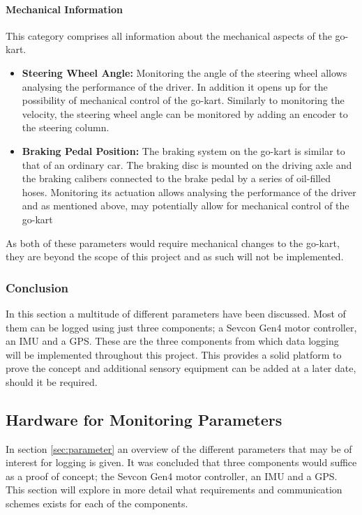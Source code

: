 \paragraph*{Mechanical Information}
This category comprises all information about the mechanical aspects of the go-kart.
\begin{itemize}
	\item \textbf{Steering Wheel Angle:} Monitoring the angle of the steering wheel allows analysing the performance of the driver.
	In addition it opens up for the possibility of mechanical control of the go-kart.
	Similarly to monitoring the velocity, the steering wheel angle can be monitored by adding an encoder to the steering column.
	\item \textbf{Braking Pedal Position:} The braking system on the go-kart is similar to that of an ordinary car.
	The braking disc is mounted on the driving axle and the braking calibers connected to the brake pedal by a series of oil-filled hoses.
	Monitoring its actuation allows analysing the performance of the driver and as mentioned above, may potentially allow for mechanical control of the go-kart
\end{itemize}
As both of these parameters would require mechanical changes to the go-kart, they are beyond the scope of this project and as such will not be implemented.
\subsubsection*{Conclusion}
In this section a multitude of different parameters have been discussed.
Most of them can be logged using just three components; a Sevcon Gen4 motor controller, an IMU and a GPS.
These are the three components from which data logging will be implemented throughout this project.
This provides a solid platform to prove the concept and additional sensory equipment can be added at a later date, should it be required.

\subsection{Hardware for Monitoring Parameters}
In section \ref{sec:parameter} an overview of the different parameters that may be of interest for logging is given.
It was concluded that three components would suffice as a proof of concept; the Sevcon Gen4 motor controller, an IMU and a GPS.
This section will explore in more detail what requirements and communication schemes exists for each of the components.

